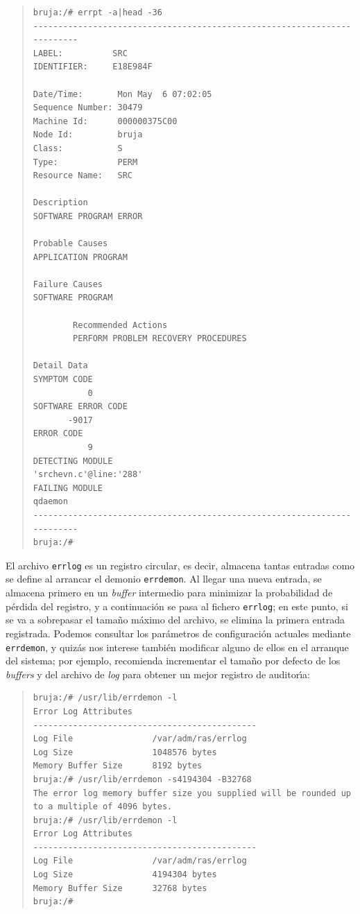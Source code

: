 \begin{quote}
\begin{verbatim}
bruja:/# errpt -a|head -36
-------------------------------------------------------------------------
LABEL:          SRC
IDENTIFIER:     E18E984F

Date/Time:       Mon May  6 07:02:05 
Sequence Number: 30479
Machine Id:      000000375C00
Node Id:         bruja
Class:           S
Type:            PERM
Resource Name:   SRC

Description
SOFTWARE PROGRAM ERROR

Probable Causes
APPLICATION PROGRAM

Failure Causes
SOFTWARE PROGRAM

        Recommended Actions
        PERFORM PROBLEM RECOVERY PROCEDURES

Detail Data
SYMPTOM CODE
           0
SOFTWARE ERROR CODE
       -9017
ERROR CODE
           9
DETECTING MODULE
'srchevn.c'@line:'288'
FAILING MODULE
qdaemon
-------------------------------------------------------------------------
bruja:/# 
\end{verbatim}
\end{quote}
El archivo {\tt errlog} es un registro circular, es decir, almacena tantas
entradas como se define al arrancar el demonio {\tt errdemon}. Al llegar una
nueva entrada, se almacena primero en un {\it buffer} intermedio para minimizar
la probabilidad de p\'erdida del registro, y a continuaci\'on se pasa al 
fichero {\tt errlog}; en este punto, si se va a sobrepasar el tama\~no m\'aximo 
del archivo, se elimina la primera entrada registrada. Podemos consultar los
par\'ametros de configuraci\'on actuales mediante {\tt errdemon}, y quiz\'as 
nos interese tambi\'en modificar alguno de ellos en el arranque del sistema; 
por ejemplo, \cite{kn:bha01} recomienda incrementar el tama\~no por defecto de 
los {\it buffers} y del archivo de {\it log} para obtener un mejor registro de 
auditor\'{\i}a:
\begin{quote}
\begin{verbatim}
bruja:/# /usr/lib/errdemon -l
Error Log Attributes
---------------------------------------------
Log File                /var/adm/ras/errlog
Log Size                1048576 bytes
Memory Buffer Size      8192 bytes
bruja:/# /usr/lib/errdemon -s4194304 -B32768
The error log memory buffer size you supplied will be rounded up
to a multiple of 4096 bytes.
bruja:/# /usr/lib/errdemon -l
Error Log Attributes
---------------------------------------------
Log File                /var/adm/ras/errlog
Log Size                4194304 bytes
Memory Buffer Size      32768 bytes
bruja:/# 
\end{verbatim}
\end{quote}
